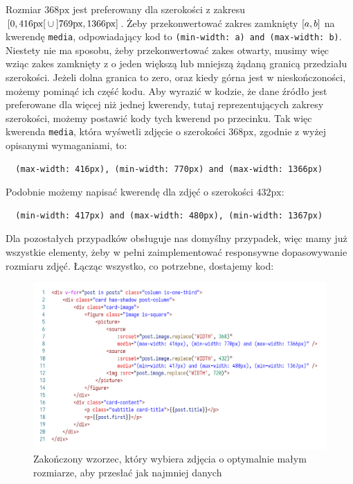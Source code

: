 \documentclass[licencjacka]{pracadypl}
\newcommand{\selfnote}[1]{\colorbox{pink}{#1}}
\begin{document}

Rozmiar $368\text{px}$ jest preferowany dla szerokości z zakresu $\rinterval{0}{416\text{px}} \cup \linterval{769\text{px}}{1366\text{px}}$. Żeby przekonwertować zakres zamknięty $\interval{a}{b}$ na kwerendę \texttt{media}, odpowiadający kod to \texttt{(min-width: a) and (max-width: b)}. Niestety nie ma sposobu, żeby przekonwertować zakes otwarty, musimy więc wziąc zakes zamknięty z o jeden większą lub mniejszą żądaną granicą przedziału szerokości. Jeżeli dolna granica to zero, oraz kiedy górna jest w nieskończoności, możemy pominąć ich część kodu. Aby wyrazić w kodzie, że dane źródło jest preferowane dla więcej niż jednej kwerendy, tutaj reprezentujących zakresy szerokości, możemy postawić kody tych kwerend po przecinku.
Tak więc kwerenda \texttt{media}, która wyśwetli zdjęcie o szerokości $368\text{px}$, zgodnie z wyżej opisanymi wymaganiami, to:
\begin{verbatim}
  (max-width: 416px), (min-width: 770px) and (max-width: 1366px)
\end{verbatim}
Podobnie możemy napisać kwerendę dla zdjęć o szerokości $432\text{px}$:
\begin{verbatim}
  (min-width: 417px) and (max-width: 480px), (min-width: 1367px)
\end{verbatim}
Dla pozostałych przypadków obsługuje nas domyślny przypadek, więc mamy już wszystkie elementy, żeby w pełni zaimplementować responsywne dopasowywanie rozmiaru zdjęć. Łącząc wszystko, co potrzebne, dostajemy kod:

\begin{figure}[H]
  \includegraphics[width=\linewidth]{images/code-vue-image-card-done.png}
  \caption{Zakończony wzorzec, który wybiera zdjęcia o optymalnie małym rozmiarze, aby przesłać jak najmniej danych}
  \label{fig:code-vue-template-articles-done}
\end{figure}
\end{document}
